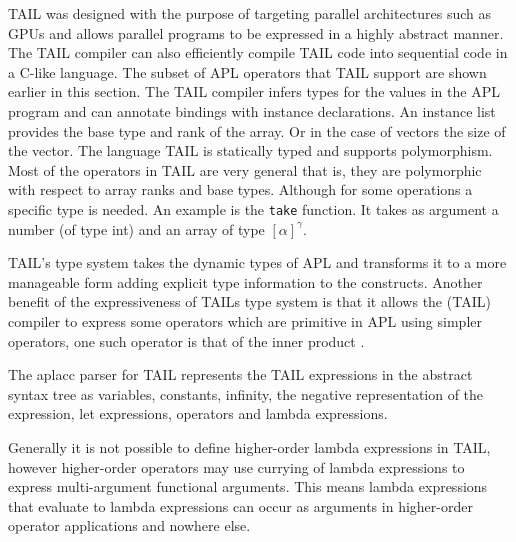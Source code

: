\documentclass[11pt]{article}
\begin{document}
TAIL was designed with the purpose of targeting parallel architectures such as GPUs and allows parallel programs to be
expressed in a highly abstract manner.
The TAIL compiler can also efficiently compile TAIL code into sequential code in a C-like language.
The subset of APL operators that TAIL support are shown earlier in this section.
The TAIL compiler infers types for the values in the APL program and can annotate bindings with
instance declarations. An instance list provides the base type and rank of the array. Or in
the case of vectors the size of the vector.
The language TAIL is statically typed and supports polymorphism. 
Most of the operators in TAIL are very general that is, they are polymorphic with respect to array ranks and base types.
Although for some operations a specific type is needed.
An example is the {\tt take} function. It takes as argument a number (of type int) and an array of type $[\alpha]^\gamma$.

TAIL's type system takes the dynamic types of APL and transforms it to a more manageable form adding explicit type
information to the constructs.
Another benefit of the expressiveness of TAILs type system is that it allows the (TAIL) compiler to express some operators which
are primitive in APL using simpler operators, one such operator is that of the inner product \cite{ElsmanDybdal:Array:2014}. 

The aplacc parser for TAIL represents the TAIL expressions in the abstract syntax tree as variables, constants, infinity, the negative representation of 
the expression, let expressions, operators and lambda expressions. 


Generally it is not possible to define higher-order lambda expressions in TAIL, however higher-order operators
may use currying of lambda expressions to express multi-argument functional arguments.
This means lambda expressions that evaluate to lambda expressions can occur as arguments in higher-order operator
applications and nowhere else.


\end{document}
